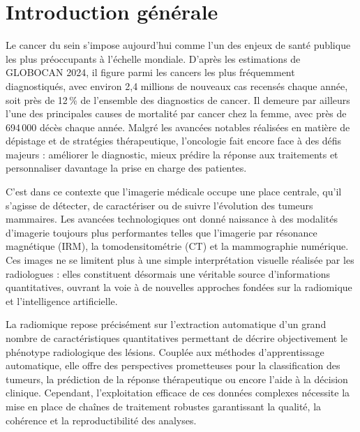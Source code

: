 \documentclass[12pt,a4paper]{report}
\begin{document}
	\newpage
	\setlength{\parindent}{1.5em}
	
	\section*{Introduction générale}
    
    Le cancer du sein s'impose aujourd'hui comme l'un des enjeux de santé publique les plus préoccupants à l'échelle mondiale. D'après les estimations de GLOBOCAN 2024, il figure parmi les cancers les plus fréquemment diagnostiqués, avec environ 2,4 millions de nouveaux cas recensés chaque année, soit près de 12\,\% de l'ensemble des diagnostics de cancer. Il demeure par ailleurs l'une des principales causes de mortalité par cancer chez la femme, avec près de 694\,000 décès chaque année. Malgré les avancées notables réalisées en matière de dépistage et de stratégies thérapeutique, l'oncologie fait encore face à des défis majeurs : améliorer le diagnostic, mieux prédire la réponse aux traitements et personnaliser davantage la prise en charge des patientes.
    
    C'est dans ce contexte que l'imagerie médicale occupe une place centrale, qu'il s'agisse de détecter, de caractériser ou de suivre l'évolution des tumeurs mammaires. Les avancées technologiques ont donné naissance à des modalités d'imagerie toujours plus performantes telles que l'imagerie par résonance magnétique (IRM), la tomodensitométrie (CT) et la mammographie numérique. Ces images ne se limitent plus à une simple interprétation visuelle réalisée par les radiologues : elles constituent désormais une véritable source d'informations quantitatives, ouvrant la voie à de nouvelles approches fondées sur la radiomique et l'intelligence artificielle.
    
    La radiomique repose précisément sur l'extraction automatique d'un grand nombre de caractéristiques quantitatives permettant de décrire objectivement le phénotype radiologique des lésions. Couplée aux méthodes d'apprentissage automatique, elle offre des perspectives prometteuses pour la classification des tumeurs, la prédiction de la réponse thérapeutique ou encore l'aide à la décision clinique. Cependant, l'exploitation efficace de ces données complexes nécessite la mise en place de chaînes de traitement robustes garantissant la qualité, la cohérence et la reproductibilité des analyses.
    
\end{document}
